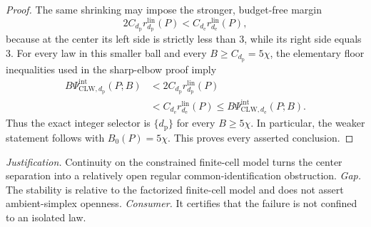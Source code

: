 \documentclass{article}
\begin{document}
\begin{proof}
The same shrinking may impose the stronger, budget-free margin
\[
 2C_{d_{\mathrm p}}r_{d_{\mathrm p}}^{\mathrm{lin}}(P)
 <C_{d_{\mathrm e}}r_{d_{\mathrm e}}^{\mathrm{lin}}(P),   \tag{33}
\]
because at the center its left side is strictly less than \(3\), while its right side equals \(3\).  For every law in this smaller ball and every \(B\ge C_{d_{\mathrm p}}=5\chi\), the elementary floor inequalities used in the sharp-elbow proof imply
\[
\begin{aligned}
 B\Psi_{\mathrm{CLW},d_{\mathrm p}}^{\mathrm{int}}(P;B)
 &<2C_{d_{\mathrm p}}r_{d_{\mathrm p}}^{\mathrm{lin}}(P)\\
 &<C_{d_{\mathrm e}}r_{d_{\mathrm e}}^{\mathrm{lin}}(P)
 \le B\Psi_{\mathrm{CLW},d_{\mathrm e}}^{\mathrm{int}}(P;B).
\end{aligned}                                               \tag{34}
\]
Thus the exact integer selector is \(\{d_{\mathrm p}\}\) for every \(B\ge5\chi\).  In particular, the weaker statement follows with \(B_0(P)=5\chi\).  This proves every asserted conclusion.
\end{proof}
\par\smallskip\noindent \textit{Justification.} Continuity on the constrained finite-cell model turns the center separation into a relatively open regular common-identification obstruction. \textit{Gap.} The stability is relative to the factorized finite-cell model and does not assert ambient-simplex openness. \textit{Consumer.} It certifies that the failure is not confined to an isolated law.
\end{document}
